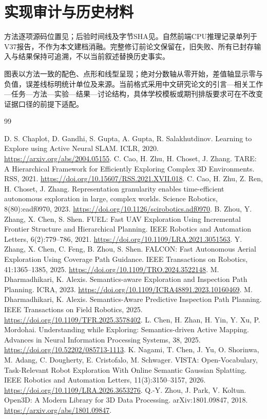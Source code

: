 \documentclass[11pt,a4paper]{article}
\begin{document}
\section{实现审计与历史材料}
方法逐项源码位置见；后验时间线及字节SHA见。自然前端CPU推理记录单列于V37报告，不作为本文建档消融。完整修订前论文保留在，旧失败、所有已封存输入与结果保持可追溯，不以当前叙述替换历史事实。

图表以方法一致的配色、点形和线型呈现；绝对分数轴从零开始，差值轴显示零与负值，误差线标明统计单位及来源。当前格式采用中文研究论文的引言—相关工作—任务—方法—实验—结果—讨论结构，具体学校模板或期刊排版要求可在不改变证据口径的前提下适配。

\begin{thebibliography}{99}
\raggedright
\small
\setlength{\itemsep}{2pt}
\setlength{\parskip}{0pt}
 D. S. Chaplot, D. Gandhi, S. Gupta, A. Gupta, R. Salakhutdinov. Learning to Explore using Active Neural SLAM. ICLR, 2020. \url{https://arxiv.org/abs/2004.05155}.
 C. Cao, H. Zhu, H. Choset, J. Zhang. TARE: A Hierarchical Framework for Efficiently Exploring Complex 3D Environments. RSS, 2021. \url{https://doi.org/10.15607/RSS.2021.XVII.018}.
 C. Cao, H. Zhu, Z. Ren, H. Choset, J. Zhang. Representation granularity enables time-efficient autonomous exploration in large, complex worlds. Science Robotics, 8(80):eadf0970, 2023. \url{https://doi.org/10.1126/scirobotics.adf0970}.
 B. Zhou, Y. Zhang, X. Chen, S. Shen. FUEL: Fast UAV Exploration Using Incremental Frontier Structure and Hierarchical Planning. IEEE Robotics and Automation Letters, 6(2):779--786, 2021. \url{https://doi.org/10.1109/LRA.2021.3051563}.
 Y. Zhang, X. Chen, C. Feng, B. Zhou, S. Shen. FALCON: Fast Autonomous Aerial Exploration Using Coverage Path Guidance. IEEE Transactions on Robotics, 41:1365--1385, 2025. \url{https://doi.org/10.1109/TRO.2024.3522148}.
 M. Dharmadhikari, K. Alexis. Semantics-aware Exploration and Inspection Path Planning. ICRA, 2023. \url{https://doi.org/10.1109/ICRA48891.2023.10160469}.
 M. Dharmadhikari, K. Alexis. Semantics-Aware Predictive Inspection Path Planning. IEEE Transactions on Field Robotics, 2025. \url{https://doi.org/10.1109/TFR.2025.3578402}.
 L. Chen, H. Zhan, H. Yin, Y. Xu, P. Mordohai. Understanding while Exploring: Semantics-driven Active Mapping. Advances in Neural Information Processing Systems, 38, 2025. \url{https://doi.org/10.52202/085713-1113}.
 K. Nagami, T. Chen, J. Yu, O. Shorinwa, M. Adang, C. Dougherty, E. Cristofalo, M. Schwager. VISTA: Open-Vocabulary, Task-Relevant Robot Exploration With Online Semantic Gaussian Splatting. IEEE Robotics and Automation Letters, 11(3):3150--3157, 2026. \url{https://doi.org/10.1109/LRA.2026.3653276}.
 Q.-Y. Zhou, J. Park, V. Koltun. Open3D: A Modern Library for 3D Data Processing. arXiv:1801.09847, 2018. \url{https://arxiv.org/abs/1801.09847}.
\end{thebibliography}
\end{document}
